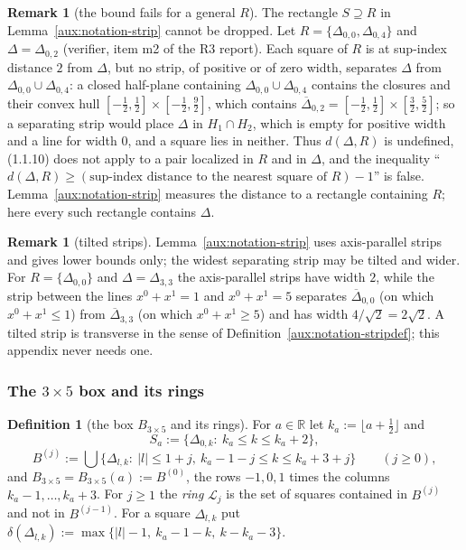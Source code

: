 \documentclass[11pt,a4paper]{article}
\theoremstyle{plain}
\theoremstyle{definition}
\theoremstyle{plain}
\theoremstyle{definition}
\newtheorem{auxdef}[auxlemma]{Definition}
\newtheorem{auxrem}[auxlemma]{Remark}
\newcommand{\R}{\mathbb{R}}
\begin{document}
\begin{auxrem}[the bound fails for a general $R$]\label{aux:notation-counterex}
The rectangle $S\supseteq R$ in Lemma~\ref{aux:notation-strip} cannot be dropped.  Let
$R=\{\Delta_{0,0},\Delta_{0,4}\}$ and $\Delta=\Delta_{0,2}$ (verifier, item m2 of the R3
report).  Each square of $R$ is at sup-index distance $2$ from $\Delta$, but no strip, of
positive or of zero width, separates $\Delta$ from $\Delta_{0,0}\cup\Delta_{0,4}$: a closed
half-plane containing $\Delta_{0,0}\cup\Delta_{0,4}$ contains the closures and their convex
hull $[-\frac12,\frac12]\times[-\frac12,\frac92]$, which contains
$\overline\Delta_{0,2}=[-\frac12,\frac12]\times[\frac32,\frac52]$; so a separating strip would
place $\Delta$ in $H_1\cap H_2$, which is empty for positive width and a line for width
$0$, and a square lies in neither.  Thus $d(\Delta,R)$ is undefined, (1.1.10) does not apply
to a pair localized in $R$ and in $\Delta$, and the inequality
``$d(\Delta,R)\ge(\text{sup-index distance to the nearest square of }R)-1$'' is false.
Lemma~\ref{aux:notation-strip} measures the distance to a rectangle containing $R$; here
every such rectangle contains $\Delta$.
\end{auxrem}

\begin{auxrem}[tilted strips]\label{aux:notation-tilted}
Lemma~\ref{aux:notation-strip} uses axis-parallel strips and gives lower bounds only; the
widest separating strip may be tilted and wider.  For $R=\{\Delta_{0,0}\}$ and
$\Delta=\Delta_{3,3}$ the axis-parallel strips have width $2$, while the strip between the
lines $x^0+x^1=1$ and $x^0+x^1=5$ separates $\overline\Delta_{0,0}$ (on which $x^0+x^1\le1$)
from $\overline\Delta_{3,3}$ (on which $x^0+x^1\ge5$) and has width $4/\sqrt2=2\sqrt2$.  A
tilted strip is transverse in the sense of Definition~\ref{aux:notation-stripdef}; this appendix
never needs one.
\end{auxrem}

\subsubsection{The $3\times5$ box and its rings}\label{sec:notation-rings}

\begin{auxdef}[the box $B_{3\times5}$ and its rings]\label{aux:notation-ringdef}
For $a\in\R$ let $k_a:=\lfloor a+\frac12\rfloor$ and
\[
 S_a:=\{\Delta_{0,k}:\ k_a\le k\le k_a+2\},
\]
\[
 B^{(j)}:=\bigcup\{\Delta_{l,k}:\ |l|\le1+j,\ k_a-1-j\le k\le k_a+3+j\}\qquad(j\ge0),
\]
and $B_{3\times5}=B_{3\times5}(a):=B^{(0)}$, the rows $-1,0,1$ times the columns
$k_a-1,\dots,k_a+3$.  For $j\ge1$ the \emph{ring} $\mathcal L_j$ is the set of squares
contained in $B^{(j)}$ and not in $B^{(j-1)}$.  For a square $\Delta_{l,k}$ put
$\delta(\Delta_{l,k}):=\max\{|l|-1,\ k_a-1-k,\ k-k_a-3\}$.
\end{auxdef}
\end{document}
